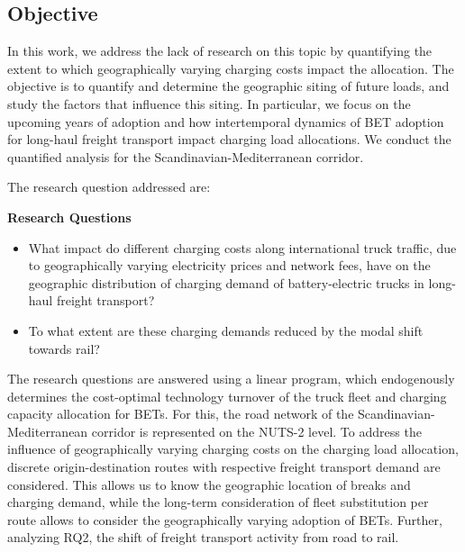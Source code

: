 \documentclass[preprint,10pt,review, authoryear]{elsarticle}
\begin{document}
    \subsection{Objective}

    In this work, we address the lack of research on this topic by quantifying the extent to which geographically varying charging costs impact the allocation. The objective is to quantify and determine the geographic siting of future loads, and study the factors that influence this siting. In particular, we focus on the upcoming years of adoption and how intertemporal dynamics of BET adoption for long-haul freight transport impact charging load allocations. We conduct the quantified analysis for the Scandinavian-Mediterranean corridor.                

    The research question addressed are:
    
    \begin{framed}
        \textbf{Research Questions}
        \begin{itemize} 
            
            
            \item[RQ1] What impact do different charging costs along international truck traffic, due to geographically varying electricity prices and network fees, have on the geographic distribution of charging demand of battery-electric trucks in long-haul freight transport?

            \item[RQ2] To what extent are these charging demands reduced by the modal shift towards rail? 
        \end{itemize}
    \end{framed}

    The research questions are answered using a linear program, which endogenously determines the cost-optimal technology turnover of the truck fleet and charging capacity allocation for BETs. For this, the road network of the Scandinavian-Mediterranean corridor is represented on the NUTS-2 level. To address the influence of geographically varying charging costs on the charging load allocation, discrete origin-destination routes with respective freight transport demand are considered. This allows us to know the geographic location of breaks and charging demand, while the long-term consideration of fleet substitution per route allows to consider the geographically varying adoption of BETs. Further, analyzing RQ2, the shift of freight transport activity from road to rail. 
    
\end{document}

